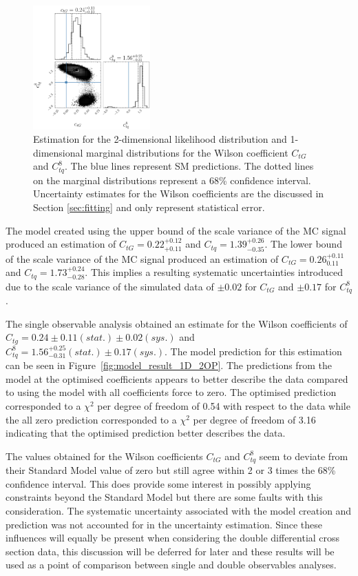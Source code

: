 \documentclass[a4paper,11pt]{article}
\begin{document}
\begin{figure}[htb]
    \centering
    \includegraphics[width=0.4\textwidth]{plots/ATLAS-ctg-ctq8_1D_2OP.png}
    \caption{Estimation for the 2-dimensional likelihood distribution and 1-dimensional marginal distributions for the Wilson coefficient $C_{tG}$ and $C_{tq}^{8}$. The blue lines represent SM predictions. The dotted lines on the marginal distributions represent a 68\% confidence interval. Uncertainty estimates for the Wilson coefficients are the discussed in Section \ref{sec:fitting} and only represent statistical error.}
    \label{fig:corner_1D_2OP}
\end{figure}

The model created using the upper bound of the scale variance of the MC signal produced an estimation of $C_{tG}=0.22^{+0.12}_{+0.11}$ and $C_{tq}=1.39_{-0.35}^{+0.26}$.
The lower bound of the scale variance of the MC signal produced an estimation of $C_{tG}=0.26^{+0.11}_{0.11}$ and $C_{tq}=1.73_{-0.28}^{+0.24}$.
This implies a resulting systematic uncertainties introduced due to the scale variance of the simulated data of $\pm0.02$ for $C_{tG}$ and $\pm0.17$ for $C_{tq}^{8}$.

The single observable analysis obtained an estimate for the Wilson coefficients of $C_{tg} = 0.24 \pm 0.11 (stat.) \pm 0.02 (sys.)$ and $C_{tq}^{8}=1.56^{+0.25}_{-0.31} (stat.) \pm 0.17 (sys.)$.
The model prediction for this estimation can be seen in Figure~\ref{fig:model_result_1D_2OP}.
The predictions from the model at the optimised coefficients appears to better describe the data compared to using the model with all coefficients force to zero.
The optimised prediction corresponded to a $\chi^{2}$ per degree of freedom of 0.54 with respect to the data while the all zero prediction corresponded to a $\chi^{2}$ per degree of freedom of 3.16 indicating that the optimised prediction better describes the data.

The values obtained for the Wilson coefficients $C_{tG}$ and $C_{tq}^{8}$ seem to deviate from their Standard Model value of zero but still agree within 2 or 3 times the 68\% confidence interval.
This does provide some interest in possibly applying constraints beyond the Standard Model but there are some faults with this consideration.
The systematic uncertainty associated with the model creation and prediction was not accounted for in the uncertainty estimation.
Since these influences will equally be present when considering the double differential cross section data, this discussion will be deferred for later and these results will be used as a point of comparison between single and double observables analyses.
\end{document}
